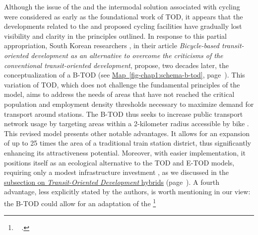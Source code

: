 \begin{refsegment}
Although the issue of the  and the intermodal solution associated with cycling were considered as early as the foundational work of \acrshort{TOD}, it appears that the developments related to the  and proposed cycling facilities have gradually lost visibility and clarity in the principles outlined. In response to this partial appropriation, South Korean researchers \textcolor{blue}{\textcite[979]{lee_bicycle-based_2016}}, in their article \textsl{Bicycle-based transit-oriented development as an alternative to overcome the criticisms of the conventional transit-oriented development}, propose, two decades later, the conceptualization of a \acrfull{B-TOD} (see \hyperref[fig-chap1:schema-b-tod]{Map~\ref{fig-chap1:schema-b-tod}}, page~\pageref{fig-chap1:schema-b-tod}). This variation of \acrshort{TOD}, which does not challenge the fundamental principles of the model, aims to address the needs of areas that have not reached the critical population and employment density thresholds necessary to maximize demand for transport around stations. The \acrshort{B-TOD} thus seeks to increase public transport network usage by targeting areas within a 2-kilometer radius accessible by bike \textcolor{blue}{\autocite[979]{lee_bicycle-based_2016}}. This revised model presents other notable advantages. It allows for an expansion of up to 25 times the area of a traditional train station district, thus significantly enhancing its attractiveness potential. Moreover, with easier implementation, it positions itself as an ecological alternative to the \acrshort{TOD} and \acrshort{E-TOD} models, requiring only a modest infrastructure investment \textcolor{blue}{\autocite[979, 983]{lee_bicycle-based_2016}}, as we discussed in the \hyperref[chap1:tod-presentation-generale-declinaisons-hybrids]{subsection on \textsl{Transit-Oriented Development} hybrids} (page~\pageref{chap1:tod-presentation-generale-declinaisons-hybrids}). A fourth advantage, less explicitly stated by the authors, is worth mentioning in our view: the \acrshort{B-TOD} could allow for an adaptation of the \footnote{~
     \textcolor{blue}{\autocite[983]{lee_bicycle-based_2016}}.
}
\end{refsegment}
